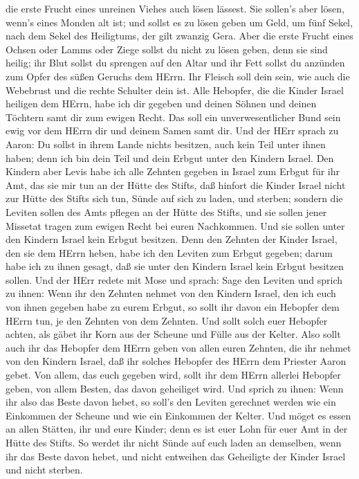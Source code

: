 die erste Frucht eines unreinen Viehes auch lösen lässest. 
Sie sollen's aber lösen, wenn's eines Monden alt ist; und sollst es zu
lösen geben um Geld, um fünf Sekel, nach dem Sekel des Heiligtums, der
gilt zwanzig Gera.  Aber die erste Frucht eines Ochsen oder
Lamms oder Ziege sollst du nicht zu lösen geben, denn sie sind heilig;
ihr Blut sollst du sprengen auf den Altar und ihr Fett sollst du
anzünden zum Opfer des süßen Geruchs dem HErrn.  Ihr
Fleisch soll dein sein, wie auch die Webebrust und die rechte Schulter
dein ist.  Alle Hebopfer, die die Kinder Israel heiligen
dem HErrn, habe ich dir gegeben und deinen Söhnen und deinen Töchtern
samt dir zum ewigen Recht. Das soll ein unverwesentlicher Bund sein ewig
vor dem HErrn dir und deinem Samen samt dir.  Und der HErr
sprach zu Aaron: Du sollst in ihrem Lande nichts besitzen, auch kein
Teil unter ihnen haben; denn ich bin dein Teil und dein Erbgut unter den
Kindern Israel.  Den Kindern aber Levis habe ich alle
Zehnten gegeben in Israel zum Erbgut für ihr Amt, das sie mir tun an der
Hütte des Stifts,  daß hinfort die Kinder Israel nicht zur
Hütte des Stifts sich tun, Sünde auf sich zu laden, und sterben;
 sondern die Leviten sollen des Amts pflegen an der Hütte
des Stifts, und sie sollen jener Missetat tragen zum ewigen Recht bei
euren Nachkommen. Und sie sollen unter den Kindern Israel kein Erbgut
besitzen.  Denn den Zehnten der Kinder Israel, den sie dem
HErrn heben, habe ich den Leviten zum Erbgut gegeben; darum habe ich zu
ihnen gesagt, daß sie unter den Kindern Israel kein Erbgut besitzen
sollen.  Und der HErr redete mit Mose und sprach:
 Sage den Leviten und sprich zu ihnen: Wenn ihr den Zehnten
nehmet von den Kindern Israel, den ich euch von ihnen gegeben habe zu
eurem Erbgut, so sollt ihr davon ein Hebopfer dem HErrn tun, je den
Zehnten von dem Zehnten.  Und sollt solch euer Hebopfer
achten, als gäbet ihr Korn aus der Scheune und Fülle aus der Kelter.
 Also sollt auch ihr das Hebopfer dem HErrn geben von allen
euren Zehnten, die ihr nehmet von den Kindern Israel, daß ihr solches
Hebopfer des HErrn dem Priester Aaron gebet.  Von allem,
das euch gegeben wird, sollt ihr dem HErrn allerlei Hebopfer geben, von
allem Besten, das davon geheiliget wird.  Und sprich zu
ihnen: Wenn ihr also das Beste davon hebet, so soll's den Leviten
gerechnet werden wie ein Einkommen der Scheune und wie ein Einkommen der
Kelter.  Und möget es essen an allen Stätten, ihr und eure
Kinder; denn es ist euer Lohn für euer Amt in der Hütte des Stifts.
 So werdet ihr nicht Sünde auf euch laden an demselben,
wenn ihr das Beste davon hebet, und nicht entweihen das Geheiligte der
Kinder Israel und nicht sterben.

